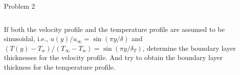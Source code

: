 \documentclass[9pt, aspectratio=169, handout]{beamer}
\begin{document}
\begin{frame}{Problem 2}
    \begin{columns}
        If both the velocity profile and the temperature profile are assumed to be sinusoidal, i.e., $u(y) / u_{\infty} = \sin(\pi y/\delta)$ and $(T(y) - T_w) / (T_{\infty} - T_w) = \sin(\pi y/\delta_T)$, determine the boundary layer thicknesses for the velocity profile. And try to obtain the boundary layer thickness for the temperature profile.
    \end{columns}
\end{frame}
\end{document}
